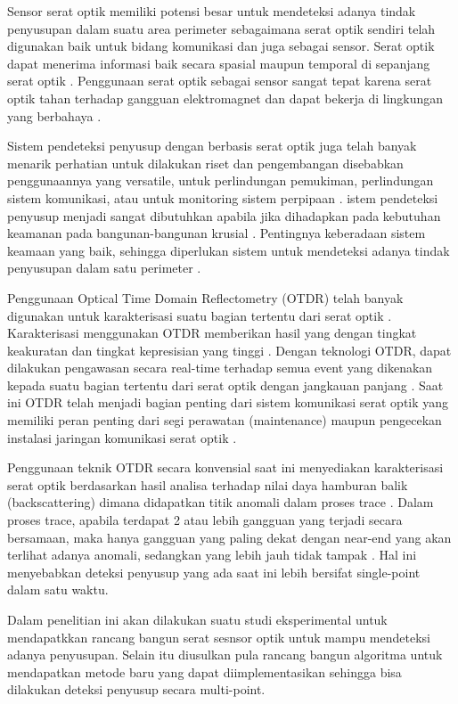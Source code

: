 \documentclass[12pt]{article}
\begin{document}
	Sensor serat optik memiliki potensi besar untuk mendeteksi adanya tindak penyusupan dalam suatu area perimeter sebagaimana serat optik sendiri telah digunakan baik untuk bidang komunikasi dan juga sebagai sensor.
	Serat optik dapat menerima informasi baik secara spasial maupun temporal di sepanjang serat optik \cite{Rao2008}.
	Penggunaan serat optik sebagai sensor sangat tepat karena serat optik tahan terhadap gangguan elektromagnet dan dapat bekerja di lingkungan yang berbahaya \cite{Bremer2016}.
	
	Sistem pendeteksi penyusup dengan berbasis serat optik juga telah banyak menarik perhatian untuk dilakukan riset dan pengembangan disebabkan penggunaannya yang versatile, untuk perlindungan pemukiman, perlindungan sistem komunikasi, atau untuk monitoring sistem perpipaan \cite{Lai2017}.
	istem pendeteksi penyusup menjadi sangat dibutuhkan apabila jika dihadapkan pada kebutuhan keamanan pada bangunan-bangunan krusial \cite{Quwaider2017}.
	Pentingnya keberadaan sistem keamaan yang baik, sehingga diperlukan sistem untuk mendeteksi adanya tindak penyusupan dalam satu perimeter \cite{Huang2017}.
	
	Penggunaan Optical Time Domain Reflectometry (OTDR) telah banyak digunakan untuk karakterisasi suatu bagian tertentu dari serat optik \cite{Dong2015}.
	Karakterisasi menggunakan OTDR memberikan hasil yang dengan tingkat keakuratan dan tingkat kepresisian yang tinggi \cite{He2016}.
	Dengan teknologi OTDR, dapat dilakukan pengawasan secara real-time terhadap semua event yang dikenakan kepada suatu bagian tertentu dari serat optik dengan jangkauan panjang \cite{Optical2007}.
	Saat ini OTDR telah menjadi bagian penting dari sistem komunikasi serat optik yang memiliki peran penting dari segi perawatan (maintenance) maupun pengecekan instalasi jaringan komunikasi serat optik \cite{Nettest2000}.
	
	Penggunaan teknik OTDR secara konvensial saat ini menyediakan karakterisasi serat optik berdasarkan hasil analisa terhadap nilai daya hamburan balik (backscattering) dimana didapatkan titik anomali dalam proses trace \cite{Dong2015}.
	Dalam proses trace, apabila terdapat 2 atau lebih gangguan yang terjadi secara bersamaan, maka hanya gangguan yang paling dekat dengan near-end  yang akan terlihat adanya anomali, sedangkan yang lebih jauh tidak tampak \cite{Bao2012}.
	Hal ini menyebabkan deteksi penyusup yang ada saat ini lebih bersifat single-point dalam satu waktu. 
	
	Dalam penelitian ini akan dilakukan suatu studi eksperimental untuk mendapatkkan rancang bangun serat sesnsor optik untuk mampu mendeteksi adanya penyusupan.
	Selain itu diusulkan pula rancang bangun algoritma untuk mendapatkan metode baru yang dapat diimplementasikan sehingga bisa dilakukan deteksi penyusup secara multi-point.
	
\end{document}

